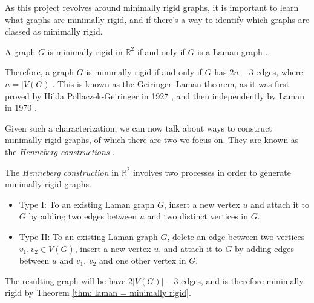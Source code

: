 \begin{flushleft}
As this project revolves around minimally rigid graphs, it is important to learn what graphs are minimally rigid, and if there's a way to identify which graphs are classed as minimally rigid. 
\end{flushleft}

\begin{theorem}
\label{thm: laman = minimally rigid}
A graph $G$ is minimally rigid in $\mathbb{R}^2$ if and only if $G$ is a Laman graph \cite{minimally_rigid}.
\end{theorem}

\begin{flushleft}
Therefore, a graph $G$ is minimally rigid if and only if $G$ has $2n-3$ edges, where $n = |V(G)|$. This is known as the Geiringer–Laman theorem, as it was first proved by Hilda Pollaczek-Geiringer in 1927 \cite{laman_theorem}, and then independently by Laman in 1970 \cite{minimally_rigid}.
\end{flushleft}

\begin{flushleft}
Given such a characterization, we can now talk about ways to construct minimally rigid graphs, of which there are two we focus on. They are known as the \textit{Henneberg constructions} \cite{henneberg}.
\end{flushleft}

\begin{definition}
\label{def: henneberg}
The \textit{Henneberg construction} in $\mathbb{R}^2$ involves two processes in order to generate minimally rigid graphs.
\begin{itemize}
    \item Type I: To an existing Laman graph $G$, insert a new vertex $u$ and attach it to $G$ by adding two edges between $u$ and two distinct vertices in $G$.
    \item Type II: To an existing Laman graph $G$, delete an edge between two vertices $v_1,v_2 \in V(G)$, insert a new vertex $u$, and attach it to $G$ by adding edges between $u$ and $v_1$, $v_2$ and one other vertex in $G$. 
\end{itemize}
\noindent
The resulting graph will be have $2|V(G)|-3$ edges, and is therefore minimally rigid by Theorem \ref{thm: laman = minimally rigid}.
\end{definition}

